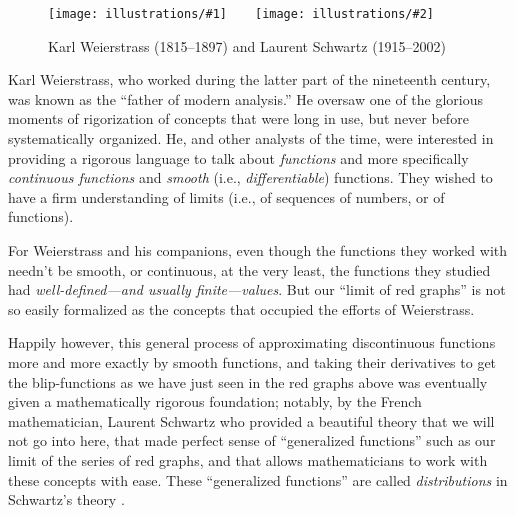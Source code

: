 \documentclass[openany]{book}
\newcommand{\illtwo}[4]{%
   \begin{figure}[H]\centering%
   \texttt{[image: illustrations/\#1]}$\qquad$\texttt{[image: illustrations/\#2]}%
   \caption{#4}%
    \end{figure}}
\theoremstyle{plain}
\theoremstyle{definition}
\begin{document}
{ %

 \illtwo{weierstrass}{schwartz}{.3}{Karl Weierstrass (1815--1897) and Laurent Schwartz (1915--2002)}

 Karl Weierstrass, who worked during the latter part of the nineteenth
 century, was known as the ``father of modern analysis.'' He oversaw
 one of the glorious moments of rigorization of concepts that were
 long in use, but never before systematically organized.  He, and
 other analysts of the time, were interested in providing a rigorous
 language to talk about {\it functions} and more specifically {\it
   continuous functions} and {\it smooth} (i.e., {\it differentiable})
 functions. They wished to have a firm understanding of limits (i.e.,
 of sequences of numbers, or of functions).


 For Weierstrass and his companions, even though the functions they
 worked with needn't be smooth, or continuous, at the very least, the
 functions they studied had {\it well-defined---and usually
   finite---values}.  But our ``limit of red graphs'' is not so easily
 formalized as the concepts that occupied the efforts of
 Weierstrass.

 Happily however, this general process of approximating
 discontinuous functions more and more exactly by smooth functions,
 and taking their derivatives to get the blip-functions as we have
 just seen in the red graphs above was eventually given a
 mathematically rigorous foundation; notably, by the French
 mathematician, Laurent Schwartz who provided a beautiful theory that
 we will not go into here, that made perfect sense of ``generalized
 functions'' such as our limit of the series of red graphs, and that
 allows mathematicians to work with these concepts with ease. These
 ``generalized functions'' are called {\it distributions} in
 Schwartz's theory .




}
\end{document}
